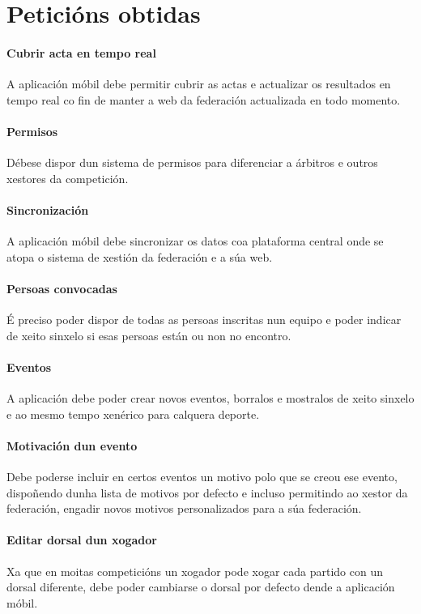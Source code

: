   \section{Peticións obtidas}
  
  \paragraph{Cubrir acta en tempo real}
  A aplicación móbil debe permitir cubrir as actas e actualizar os resultados 
en tempo real co fin de manter a web da federación actualizada en todo momento.

  \paragraph{Permisos}
  Débese dispor dun sistema de permisos para diferenciar a árbitros e outros 
xestores da competición.

  \paragraph{Sincronización}
  A aplicación móbil debe sincronizar os datos coa plataforma central onde se 
atopa o sistema de xestión da federación e a súa web.

  \paragraph{Persoas convocadas}
  É preciso poder dispor de todas as persoas inscritas nun equipo e poder 
indicar de xeito sinxelo si esas persoas están ou non no encontro.
  
  \paragraph{Eventos}
  A aplicación debe poder crear novos eventos, borralos e mostralos de xeito 
sinxelo e ao mesmo tempo xenérico para calquera deporte.
  
  \paragraph{Motivación dun evento}
  Debe poderse incluir en certos eventos un motivo polo que se creou ese 
evento, dispoñendo dunha lista de motivos por defecto e incluso permitindo ao 
xestor da federación, engadir novos motivos personalizados para a súa 
federación.

  \paragraph{Editar dorsal dun xogador}
  Xa que en moitas competicións un xogador pode xogar cada partido con un 
dorsal diferente, debe poder cambiarse o dorsal por defecto dende a aplicación 
móbil.

